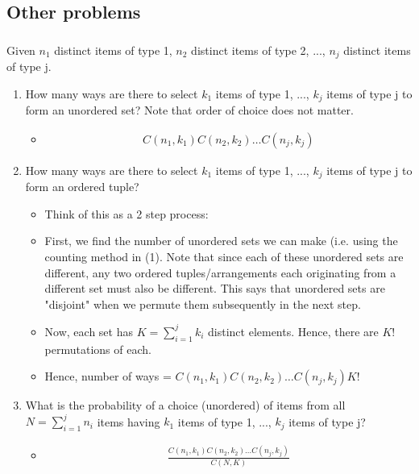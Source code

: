 \documentclass{article}
\begin{document}
\subsection{Other problems}
\subsubsection{}
Given $n_1$ distinct items of type 1, $n_2$ distinct items of type 2, ..., $n_j$ distinct items of type j.
\begin{enumerate}
    \item How many ways are there to select $k_1$ items of type 1, ..., $k_j$ items of type j to form an unordered set? Note that order of choice does not matter.
    \begin{itemize}
        \item \begin{align*}
            C(n_1, k_1)  C(n_2, k_2) \dots  C(n_j, k_j)
        \end{align*}
    \end{itemize}
    \item How many ways are there to select $k_1$ items of type 1, ..., $k_j$ items of type j to form an ordered tuple?
    \begin{itemize}
        \item Think of this as a 2 step process:
        \item First, we find the number of unordered sets we can make (i.e. using the counting method in (1). Note that since each of these unordered sets are different, any two ordered tuples/arrangements each originating from a different set must also be different. This says that unordered sets are "disjoint" when we permute them subsequently in the next step.
        \item Now, each set has $K=\sum_{i=1}^j k_i$ distinct elements. Hence, there are $K!$ permutations of each.
        \item Hence, number of ways = $C(n_1, k_1)  C(n_2, k_2) \dots  C(n_j, k_j)K!$
    \end{itemize}
    \item What is the probability of a choice (unordered) of items from all $N=\sum_{i=1}^j n_i$ items having $k_1$ items of type 1, ..., $k_j$ items of type j?
    \begin{itemize}
        \item \begin{align*}
            \frac{C(n_1, k_1)  C(n_2, k_2) \dots  C(n_j, k_j)}{C(N, K)}
        \end{align*}

\end{itemize}
\end{enumerate}
\end{document}
